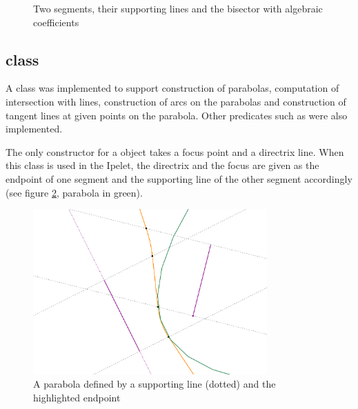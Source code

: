 \documentclass[11pt,a4paper,english]{article}
\begin{document}
	\begin{figure}[h!]
    \centering
    \caption{Two segments, their supporting lines and the bisector with algebraic coefficients \label{fig:algebraic_line}}
	\end{figure}
	

	\subsection{ class}
	A  class was implemented to support construction of parabolas, computation of intersection with lines, construction of arcs on the parabolas and construction of tangent lines at given points on the parabola. Other predicates such as  were also implemented.\par
	The only constructor for a  object takes a focus point and a directrix line. When this class is used in the Ipelet, the directrix and the focus are given as the endpoint of one segment and the supporting line of the other segment accordingly (see figure \ref{fig:parabola}, parabola in green).
	\begin{figure}[h]
    \centering
    \includegraphics[width=0.8\textwidth]{parabola}
    \caption{A parabola defined by a supporting line (dotted) and the highlighted endpoint \label{fig:parabola}}
	\end{figure}
	
\end{document}
